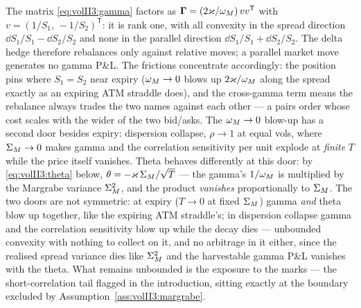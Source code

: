 \begin{remark}
\label{rem:volII3:rankone}
The matrix \eqref{eq:volII3:gamma} factors as $\mathbf{\Gamma} =
(2\varkappa/\omega_M)\,vv^{\mathsf T}$ with $v = (1/S_1,\, -1/S_2)^{\mathsf T}$: it is
rank one, with all convexity in the spread direction $\dd S_1/S_1 - \dd
S_2/S_2$ and none in the parallel direction $\dd S_1/S_1 + \dd S_2/S_2$. The
delta hedge therefore rebalances only against relative moves; a parallel
market move generates no gamma P\&L. The frictions concentrate accordingly:
the position pins where $S_1 = S_2$ near expiry ($\omega_M \to 0$ blows up
$2\varkappa/\omega_M$ along the spread exactly as an expiring ATM straddle does), and
the cross-gamma term means the rebalance always trades the two names against
each other --- a pairs order whose cost scales with the wider of
the two bid/asks. The $\omega_M \to 0$ blow-up has a second door besides expiry:
dispersion collapse, $\rho \to 1$ at equal vols, where $\Sigma_M \to 0$ makes
gamma and the correlation sensitivity per unit explode at \emph{finite}
$T$ while the price itself vanishes. Theta behaves differently at this
door: by \eqref{eq:volII3:theta} below,
$\theta = -\varkappa\,\Sigma_M/\sqrt{T}$ --- the gamma's $1/\omega_M$ is multiplied
by the Margrabe variance $\Sigma_M^2$, and the product \emph{vanishes}
proportionally to $\Sigma_M$. The two doors are not symmetric: at expiry
($T \to 0$ at fixed $\Sigma_M$) gamma \emph{and} theta blow up together,
like the expiring ATM straddle's; in dispersion collapse gamma and the
correlation sensitivity blow up while the decay dies --- unbounded
convexity with nothing to collect on it, and no arbitrage in it either,
since the realised spread variance dies like $\Sigma_M^2$ and the
harvestable gamma P\&L vanishes with the theta. What remains unbounded is
the exposure to the marks --- the short-correlation tail flagged in
the introduction, sitting exactly at the boundary excluded by
Assumption~\ref{ass:volII3:margrabe}.


\end{remark}
